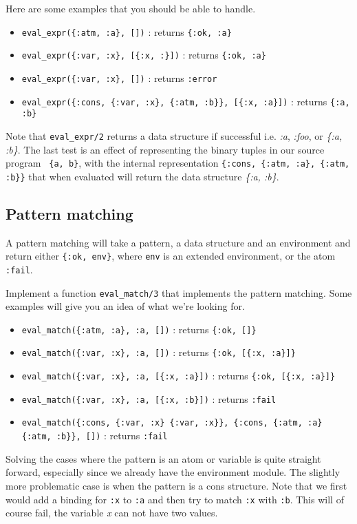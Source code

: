 \documentclass[a4paper,11pt]{article}
\begin{document}
Here are some examples that you should be able to handle.

\begin{itemize}
\item {\tt eval\_expr(\{:atm, :a\}, [])} : returns {\tt \{:ok, :a\}}
 \item {\tt eval\_expr(\{:var, :x\},  [\{:x, :\}])} : returns {\tt \{:ok, :a\}}
 \item {\tt eval\_expr(\{:var, :x\},  [])} : returns {\tt :error}
 \item {\tt eval\_expr(\{:cons, \{:var, :x\}, \{:atm, :b\}\},  [\{:x, :a\}])} : returns {\tt \{:a, :b\}} 
\end{itemize}

Note that {\tt eval\_expr/2} returns a data structure if successful
i.e. {\em :a}, {\em :foo}, or {\em \{:a, :b\}}.  The last test is an
effect of representing the binary tuples in our source program {\tt
  \{a, b\}}, with the internal representation {\tt \{:cons, \{:atm,
  :a\}, \{:atm, :b\}\}} that when evaluated will return the
data structure {\it \{:a, :b\}}.

\subsection{Pattern matching}
A pattern matching will take a pattern, a data structure and an
environment and return either {\tt \{:ok, env\}}, where {\tt env} is an
extended environment, or the atom {\tt :fail}. 

Implement a function {\tt eval\_match/3} that implements
the pattern matching. Some examples will give you an idea of what
we're looking for.

\begin{itemize}
 \item {\tt eval\_match(\{:atm, :a\}, :a, [])} : returns {\tt \{:ok, []\}}
 \item {\tt eval\_match(\{:var, :x\}, :a, [])} : returns {\tt \{:ok, [\{:x, :a\}]\}}
 \item {\tt eval\_match(\{:var, :x\}, :a, [\{:x, :a\}])} : returns {\tt \{:ok, [\{:x, :a\}]\}}
 \item {\tt eval\_match(\{:var, :x\}, :a, [\{:x, :b\}])} : returns {\tt :fail}
 \item {\tt eval\_match(\{:cons, \{:var, :x\} \{:var, :x\}\}, \{:cons, \{:atm, :a\} \{:atm, :b\}\}, [])} : returns {\tt :fail}
\end{itemize}

Solving the cases where the pattern is an atom or variable is quite
straight forward, especially since we already have the environment
module. The slightly more problematic case is when the pattern is a
cons structure. Note that we first would add a binding for {\tt :x} to
{\tt :a} and then try to match {\tt :x} with {\tt :b}. This will of
course fail, the variable {\em x} can not have two values.
\end{document}
